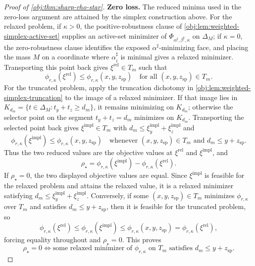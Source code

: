 \begin{proof}[Proof of \cref{obj:thm:sharp-rho-star}]
\textbf{Zero loss.}
The reduced minima used in the zero-loss argument are attained by the simplex construction above.  For the relaxed problem, if \(\kappa>0\), the positive-robustness clause of \cref{obj:lem:weighted-simplex-active-set} supplies an active-set minimizer of \(\Phi_{\alpha^\sharp,\beta^\sharp,\kappa}\) on \(\Delta_M\); if \(\kappa=0\), the zero-robustness clause identifies the exposed \(\alpha^\sharp\)-minimizing face, and placing the mass \(M\) on a coordinate where \(\alpha^\sharp_i\) is minimal gives a relaxed minimizer.  Transporting this point back gives \(\xi^{\mathrm{rel}}\in T_m\) such that
\[
\phi_{r,\kappa}(\xi^{\mathrm{rel}})
\le\phi_{r,\kappa}(x,y,z_{\mathrm{sp}})
\quad\text{for all }(x,y,z_{\mathrm{sp}})\in T_m .
\]
For the truncated problem, apply the truncation dichotomy in \cref{obj:lem:weighted-simplex-truncation} to the image of a relaxed minimizer.  If that image lies in \(K_{d_m}=\{t\in\Delta_M:t_y+t_z\ge d_m\}\), it remains minimizing on \(K_{d_m}\); otherwise the selector point on the segment \(t_y+t_z=d_m\) minimizes on \(K_{d_m}\).  Transporting the selected point back gives \(\xi^{\mathrm{impl}}\in T_m\) with \(d_m\le \xi^{\mathrm{impl}}_y+\xi^{\mathrm{impl}}_z\) and
\[
\phi_{r,\kappa}(\xi^{\mathrm{impl}})
\le\phi_{r,\kappa}(x,y,z_{\mathrm{sp}})
\quad\text{whenever }(x,y,z_{\mathrm{sp}})\in T_m\text{ and }d_m\le y+z_{\mathrm{sp}} .
\]
Thus the two reduced values are the objective values at \(\xi^{\mathrm{rel}}\) and \(\xi^{\mathrm{impl}}\), and
\[
\rho_\star
=\phi_{r,\kappa}(\xi^{\mathrm{impl}})-\phi_{r,\kappa}(\xi^{\mathrm{rel}}).
\]
If \(\rho_\star=0\), the two displayed objective values are equal.  Since \(\xi^{\mathrm{impl}}\) is feasible for the relaxed problem and attains the relaxed value, it is a relaxed minimizer satisfying \(d_m\le \xi^{\mathrm{impl}}_y+\xi^{\mathrm{impl}}_z\).  Conversely, if some \((x,y,z_{\mathrm{sp}})\in T_m\) minimizes \(\phi_{r,\kappa}\) over \(T_m\) and satisfies \(d_m\le y+z_{\mathrm{sp}}\), then it is feasible for the truncated problem, so
\[
\phi_{r,\kappa}(\xi^{\mathrm{rel}})
\le\phi_{r,\kappa}(\xi^{\mathrm{impl}})
\le\phi_{r,\kappa}(x,y,z_{\mathrm{sp}})
=\phi_{r,\kappa}(\xi^{\mathrm{rel}}),
\]
forcing equality throughout and \(\rho_\star=0\).  This proves
\[
\rho_\star=0
\iff
\text{some relaxed minimizer of }\phi_{r,\kappa}\text{ on }T_m\text{ satisfies }d_m\le y+z_{\mathrm{sp}} .
\]


\end{proof}
